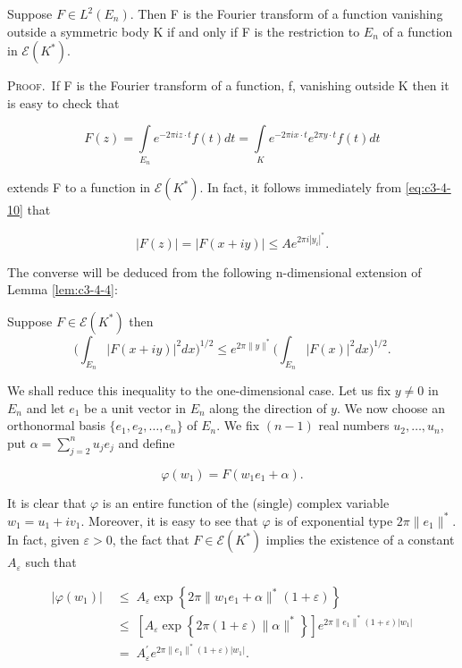 \begin{theorem}
\label{thm:c3-4-9}
Suppose $F \in L^2(E_n)$. Then F is the Fourier transform of a function vanishing outside a symmetric body K if and only if F is the restriction to $E_n$ of a function in $\mathcal{E}(K^*)$.
\end{theorem}

\textsc{Proof.}\ If F is the Fourier transform of a function, f, vanishing outside K then it is easy to check that

\begin{equation}\label{eq:c3-4-10}
F(z)=\int\limits_{E_{n}}e^{-2\pi i z\cdot t}f(t)d t=\int\limits_{K}e^{-2\pi i x\cdot t}e^{2\pi y\cdot t}f(t)d t
\end{equation}

extends F to a function in $\mathcal{E}(K^*)$. In fact, it follows immediately from \eqref{eq:c3-4-10} that

\[
|F(z)|=|F(x+i y)|\leq A e^{2\pi i|y_{i}|^{*}}.
\]

The converse will be deduced from the following n-dimensional extension of Lemma \ref{lem:c3-4-4}:

\begin{lemma}
\label{lem:c3-4-11}
Suppose $F \in \mathcal{E}(K^*)$ then
\[
\biggl(\int_{E_{n}}|F(x+i y)|^{2}d x\biggr)^{1/2}\leq e^{2\pi\|y\|^{*}}\biggl(\int_{E_{n}}|F(x)|^{2}d x\biggr)^{1/2}.
\]

\end{lemma}

We shall reduce this inequality to the one-dimensional case. Let us fix $y \neq 0$ in $E_n$ and let $e_1$ be a unit vector in $E_n$ along the direction of $y$. We now choose an orthonormal basis $\{e_1, e_2, \ldots, e_n\}$ of $E_n$. We fix $(n-1)$ real numbers $u_2, \ldots, u_n$, put $\alpha = \sum_{j=2}^{n} u_j e_j$ and define

\[
\varphi(w_{1})=F(w_{1}e_{1}+\alpha).
\]

It is clear that $\varphi$ is an entire function of the (single) complex variable $w_1 = u_1 + iv_1$. Moreover, it is easy to see that $\varphi$ is of exponential type $2\pi \|e_1\|^*$. In fact, given $\varepsilon > 0$, the fact that $F \in \mathcal{E}(K^*)$ implies the existence of a constant $A_\varepsilon$ such that

\[
\begin{aligned}{|\varphi(w_{1})|}&{{}\;\leq\;A_{\varepsilon}\exp\left\{2\pi\|w_{1}e_{1}+\alpha\|^{*}(1+\varepsilon)\right\}}\\ {}&{{}\;\leq\;[A_{\varepsilon}\exp\left\{2\pi(1+\varepsilon)\|\alpha\|^{*}\right\}]e^{2\pi\|e_{1}\|^{*}(1+\varepsilon)|w_{1}|}}\\ {}&{{}\;=\;A_{\varepsilon}^{\prime}e^{2\pi\|e_{1}\|^{*}(1+\varepsilon)|w_{1}|}.}\\ \end{aligned}
\]

